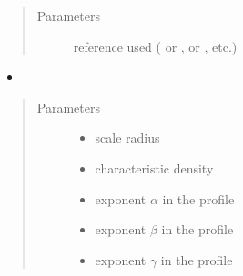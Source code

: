 \documentclass[letterpaper,10pt,english]{sphinxmanual}
\begin{document}
\begin{fulllineitems}
\begin{itemize}
\end{itemize}
\begin{quote}\begin{description}
\item[{Parameters}] \leavevmode
\sphinxAtStartPar
{} \textendash{} reference used ( or \sphinxcode{\sphinxupquote{\textquotesingle{}1309.2641\textquotesingle{}}},  or \sphinxcode{\sphinxupquote{\textquotesingle{}1408.0002\textquotesingle{}}}, etc.)

\end{description}\end{quote}
\begin{itemize}
\item {} 
\sphinxAtStartPar
{}

\end{itemize}
\begin{quote}\begin{description}
\item[{Parameters}] \leavevmode\begin{itemize}
\item {} 
\sphinxAtStartPar
{} \textendash{} scale radius

\item {} 
\sphinxAtStartPar
{} \textendash{} characteristic density

\item {} 
\sphinxAtStartPar
{} \textendash{} exponent \(\alpha\) in the {\hyperref[\detokenize{diffsph.profiles:diffsph.profiles.templates.hdz}]{}} profile

\item {} 
\sphinxAtStartPar
{} \textendash{} exponent \(\beta\) in the {\hyperref[\detokenize{diffsph.profiles:diffsph.profiles.templates.hdz}]{}} profile

\item {} 
\sphinxAtStartPar
{} \textendash{} exponent \(\gamma\) in the {\hyperref[\detokenize{diffsph.profiles:diffsph.profiles.templates.hdz}]{}} profile


\end{itemize}
\end{description}
\end{quote}
\end{fulllineitems}
\end{document}

